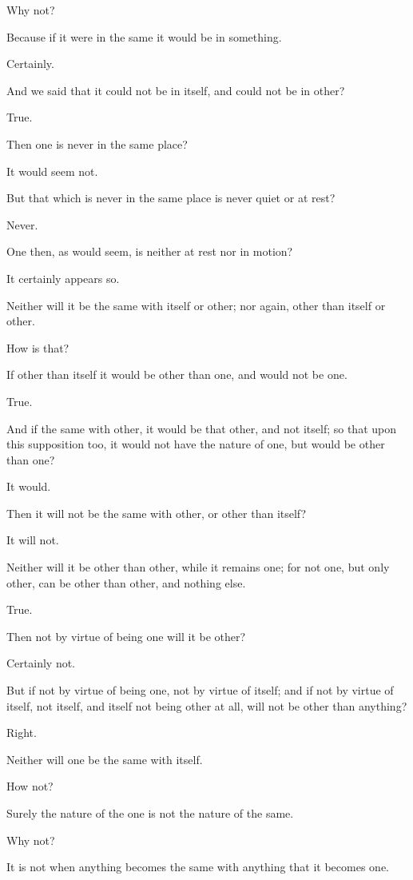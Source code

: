 Why not?

Because if it were in the same it would be in something.

Certainly.

And we said that it could not be in itself, and could not be in other?

True.

Then one is never in the same place?

It would seem not.

But that which is never in the same place is never quiet or at rest?

Never.

One then, as would seem, is neither at rest nor in motion?

It certainly appears so.

Neither will it be the same with itself or other; nor again, other than
itself or other.

How is that?

If other than itself it would be other than one, and would not be one.

True.

And if the same with other, it would be that other, and not itself; so
that upon this supposition too, it would not have the nature of one, but
would be other than one?

It would.

Then it will not be the same with other, or other than itself?

It will not.

Neither will it be other than other, while it remains one; for not one,
but only other, can be other than other, and nothing else.

True.

Then not by virtue of being one will it be other?

Certainly not.

But if not by virtue of being one, not by virtue of itself; and if not
by virtue of itself, not itself, and itself not being other at all, will
not be other than anything?

Right.

Neither will one be the same with itself.

How not?

Surely the nature of the one is not the nature of the same.

Why not?

It is not when anything becomes the same with anything that it becomes
one.


